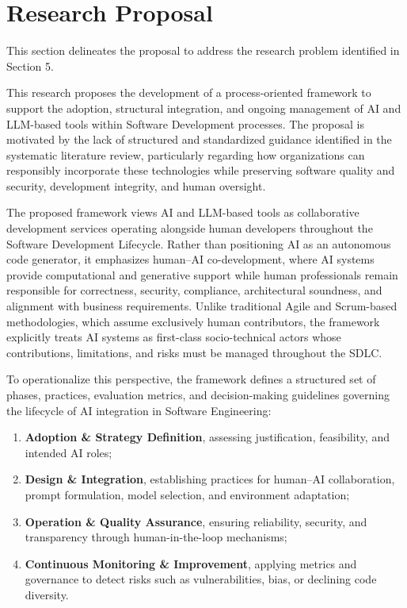 \section{Research Proposal}

This section delineates the proposal to address the research problem identified in Section 5. 

This research proposes the development of a process-oriented framework to support the adoption, structural integration, and ongoing management of AI and LLM-based tools within Software Development processes. The proposal is motivated by the lack of structured and standardized guidance identified in the systematic literature review, particularly regarding how organizations can responsibly incorporate these technologies while preserving software quality and security, development integrity, and human oversight.

The proposed framework views AI and LLM-based tools as collaborative development services operating alongside human developers throughout the Software Development Lifecycle. Rather than positioning AI as an autonomous code generator, it emphasizes human–AI co-development, where AI systems provide computational and generative support while human professionals remain responsible for correctness, security, compliance, architectural soundness, and alignment with business requirements. Unlike traditional Agile and Scrum-based methodologies, which assume exclusively human contributors, the framework explicitly treats AI systems as first-class socio-technical actors whose contributions, limitations, and risks must be managed throughout the SDLC.

To operationalize this perspective, the framework defines a structured set of phases, practices, evaluation metrics, and decision-making guidelines governing the lifecycle of AI integration in Software Engineering:

\begin{enumerate}
    \item \textbf{Adoption \& Strategy Definition}, assessing justification, feasibility, and intended AI roles;
    \item \textbf{Design \& Integration}, establishing practices for human–AI collaboration, prompt formulation, model selection, and environment adaptation;
    \item \textbf{Operation \& Quality Assurance}, ensuring reliability, security, and transparency through human-in-the-loop mechanisms;
    \item \textbf{Continuous Monitoring \& Improvement}, applying metrics and governance to detect risks such as vulnerabilities, bias, or declining code diversity.
\end{enumerate}

